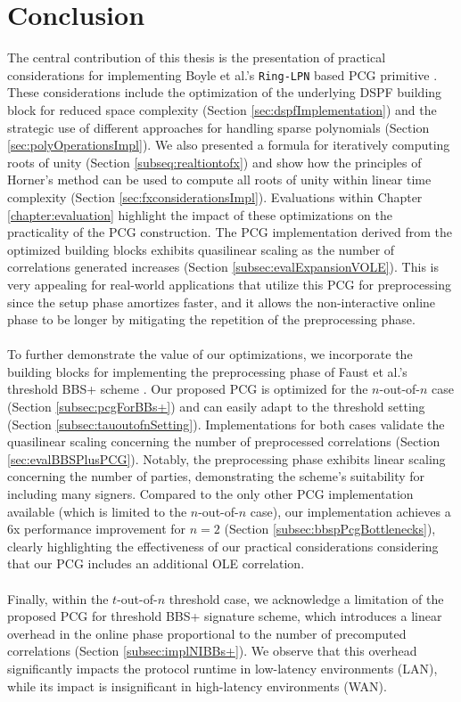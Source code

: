 \chapter{Conclusion}
The central contribution of this thesis is the presentation of practical considerations for implementing Boyle et al.'s \texttt{Ring-LPN} based PCG primitive \cite{boyle2020efficient}. These considerations include the optimization of the underlying DSPF building block for reduced space complexity (Section \ref{sec:dspfImplementation}) and the strategic use of different approaches for handling sparse polynomials (Section \ref{sec:polyOperationsImpl}). We also presented a formula for iteratively computing roots of unity (Section \ref{subseq:realtiontofx}) and show how the principles of Horner's method \cite{horner1819xxi} can be used to compute all roots of unity within linear time complexity (Section \ref{sec:fxconsiderationsImpl}). Evaluations within Chapter \ref{chapter:evaluation} highlight the impact of these optimizations on the practicality of the PCG construction. The PCG implementation derived from the optimized building blocks exhibits quasilinear scaling as the number of correlations generated increases (Section \ref{subsec:evalExpansionVOLE}). This is very appealing for real-world applications that utilize this PCG for preprocessing since the setup phase amortizes faster, and it allows the non-interactive online phase to be longer by mitigating the repetition of the preprocessing phase.
\\\\
To further demonstrate the value of our optimizations, we incorporate the building blocks for implementing the preprocessing phase of Faust et al.'s threshold BBS+ scheme \cite{faust2023non}. Our proposed PCG is optimized for the $n$-out-of-$n$ case (Section \ref{subsec:pcgForBBs+}) and can easily adapt to the threshold setting (Section \ref{subsec:tauoutofnSetting}). Implementations for both cases validate the quasilinear scaling concerning the number of preprocessed correlations (Section \ref{sec:evalBBSPlusPCG}). Notably, the preprocessing phase exhibits linear scaling concerning the number of parties, demonstrating the scheme's suitability for including many signers. Compared to the only other PCG implementation available \cite{abram2022low} (which is limited to the $n$-out-of-$n$ case), our implementation achieves a 6x performance improvement for $n=2$ (Section \ref{subsec:bbspPcgBottlenecks}), clearly highlighting the effectiveness of our practical considerations considering that our PCG includes an additional OLE correlation.
\\\\
Finally, within the $t$-out-of-$n$ threshold case, we acknowledge a limitation of the proposed PCG for threshold BBS+ signature scheme, which introduces a linear overhead in the online phase proportional to the number of precomputed correlations (Section \ref{subsec:implNIBBs+}). We observe that this overhead significantly impacts the protocol runtime in low-latency environments (LAN), while its impact is insignificant in high-latency environments (WAN).

